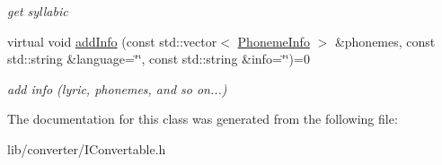 \begin{DoxyCompactItemize}
\begin{DoxyCompactList}\small\item\em get syllabic \end{DoxyCompactList}\item 
\hypertarget{classsinsy_1_1IConvertable_ae0326517f226fc7f569b5886084d6135}{virtual void \hyperlink{classsinsy_1_1IConvertable_ae0326517f226fc7f569b5886084d6135}{add\-Info} (const std\-::vector$<$ \hyperlink{classsinsy_1_1PhonemeInfo}{\-Phoneme\-Info} $>$ \&phonemes, const std\-::string \&language=\char`\"{}\char`\"{}, const std\-::string \&info=\char`\"{}\char`\"{})=0}\label{classsinsy_1_1IConvertable_ae0326517f226fc7f569b5886084d6135}

\begin{DoxyCompactList}\small\item\em add info (lyric, phonemes, and so on...) \end{DoxyCompactList}\end{DoxyCompactItemize}


\-The documentation for this class was generated from the following file\-:\begin{DoxyCompactItemize}
\item 
lib/converter/\-I\-Convertable.\-h\end{DoxyCompactItemize}
